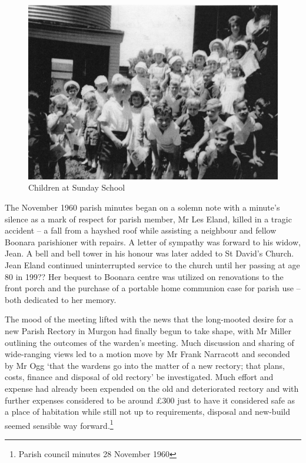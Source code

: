\begin{figure}[!htb]
\begin{center}
\includegraphics[width=1.\textwidth,center]{../images/sundaySchoolChildren.jpg}
\caption{Children at Sunday School}
\end{center}
\end{figure}




The November 1960 parish minutes began on a solemn note with a minute's silence as a mark of respect for parish member, Mr Les Eland, killed in a tragic accident -- a fall from a hayshed roof while assisting a neighbour and fellow Boonara parishioner with repairs. A letter of sympathy was forward to his widow, Jean. A bell and bell tower in his honour was later added to St David's Church. Jean Eland continued uninterrupted service to the church until her passing at age 80 in 199?? Her bequest to Boonara centre was utilized on renovations to the front porch and the purchase of a portable home communion case for parish use -- both dedicated to her memory.



The mood of the meeting lifted with the news that the long-mooted desire for a new Parish Rectory in Murgon had finally begun to take shape, with Mr Miller outlining the outcomes of the warden's meeting. Much discussion and sharing of wide-ranging views led to a motion move by Mr Frank Narracott and seconded by Mr Ogg `that the wardens go into the matter of a new rectory; that plans, costs, finance and disposal of old rectory' be investigated. Much effort and expense had already been expended on the old and deteriorated rectory and with further expenses considered to be around \pounds300 just to have it considered safe as a place of habitation while still not up to requirements, disposal and new-build seemed sensible way forward.\footnote{Parish council minutes 28 November 1960}


